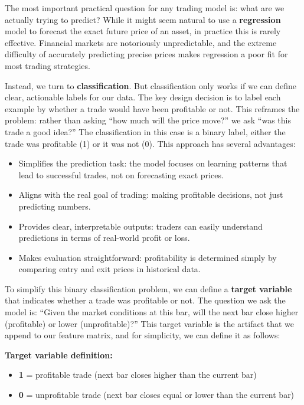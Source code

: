 The most important practical question for any trading model is: what are we actually trying to predict? 
While it might seem natural to use a \textbf{regression} model to forecast the exact future price of an asset, in practice this is rarely effective. 
Financial markets are notoriously unpredictable, and the extreme difficulty of accurately predicting precise prices makes regression a poor fit for most trading strategies.

Instead, we turn to \textbf{classification}. 
But classification only works if we can define clear, actionable labels for our data.
The key design decision is to label each example by whether a trade would have been profitable or not. 
This reframes the problem: rather than asking ``how much will the price move?'' we ask ``was this trade a good idea?''
The classification in this case is a binary label, either the trade was profitable (1) or it was not (0).
This approach has several advantages:
\begin{itemize}
  \item Simplifies the prediction task: the model focuses on learning patterns that lead to successful trades, not on forecasting exact prices.
  \item Aligns with the real goal of trading: making profitable decisions, not just predicting numbers.
  \item Provides clear, interpretable outputs: traders can easily understand predictions in terms of real-world profit or loss.
  \item Makes evaluation straightforward: profitability is determined simply by comparing entry and exit prices in historical data.
\end{itemize}

To simplify this binary classification problem, we can define a \textbf{target variable} that indicates whether a trade was profitable or not. 
The question we ask the model is: ``Given the market conditions at this bar, will the next bar close higher (profitable) or lower (unprofitable)?'' 
This target variable is the artifact that we append to our feature matrix, and for simplicity, we can define it as follows:

\textbf{Target variable definition:}
\begin{itemize}
  \item \textbf{1} = profitable trade (next bar closes higher than the current bar)
  \item \textbf{0} = unprofitable trade (next bar closes equal or lower than the current bar)
\end{itemize}

